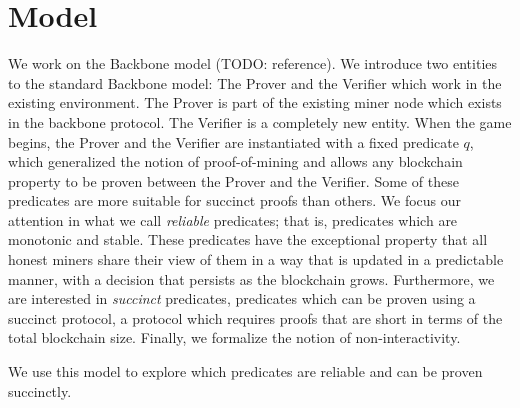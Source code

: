 \section{Model}

We work on the Backbone model (TODO: reference). We introduce two entities to
the standard Backbone model: The Prover and the Verifier which work in the
existing environment. The Prover is part of the existing miner node which
exists in the backbone protocol. The Verifier is a completely new entity. When
the game begins, the Prover and the Verifier are instantiated with a fixed
predicate $q$, which generalized the notion of proof-of-mining and allows any
blockchain property to be proven between the Prover and the Verifier. Some of
these predicates are more suitable for succinct proofs than others. We focus
our attention in what we call \textit{ reliable} predicates; that is,
predicates which are monotonic and stable.  These predicates have the
exceptional property that all honest miners share their view of them in a way
that is updated in a predictable manner, with a decision that persists as the
blockchain grows.  Furthermore, we are interested in \textit{succinct}
predicates, predicates which can be proven using a succinct protocol, a
protocol which requires proofs that are short in terms of the total blockchain
size. Finally, we formalize the notion of non-interactivity.

We use this model to explore which predicates are reliable and can be proven
succinctly.
